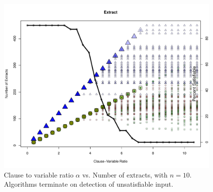\begin{figure}[htdp]

\begin{center}

\includegraphics[width=1.1\textwidth]{./figures/metricOutput_n10/extractCount.pdf}

\caption{Clause to variable ratio $\alpha$ vs. Number of extracts, with $n = 10$.  Algorithms terminate on detection of unsatisfiable input. }
\label{extractFig_10}
\end{center}
\end{figure}

			
